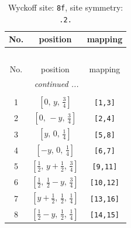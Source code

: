\documentclass[fleqn,8pt]{jsarticle}
\begin{document}
\begin{longtable}{ccc}
\caption{Wyckoff site: {\tt 8f}, site symmetry: {\tt .2.}}
 \\
 \hline \hline
No. & position & mapping \\ \hline \endfirsthead

\multicolumn{2}{l}{\tablename\ \thetable{}} \\
 \hline \hline
No. & position & mapping \\ \hline \endhead

 \hline \hline
\multicolumn{2}{r}{\footnotesize\it continued ...} \\ \endfoot

 \hline \hline
\multicolumn{2}{r}{} \\ \endlastfoot

1 & $\left[ 0,\, y,\, \frac{3}{4} \right]$ & {\tt [1,3]} \\ \hline
2 & $\left[ 0,\, - y,\, \frac{3}{4} \right]$ & {\tt [2,4]} \\ \hline
3 & $\left[ y,\, 0,\, \frac{1}{4} \right]$ & {\tt [5,8]} \\ \hline
4 & $\left[ - y,\, 0,\, \frac{1}{4} \right]$ & {\tt [6,7]} \\ \hline
5 & $\left[ \frac{1}{2},\, y + \frac{1}{2},\, \frac{3}{4} \right]$ & {\tt [9,11]} \\ \hline
6 & $\left[ \frac{1}{2},\, \frac{1}{2} - y,\, \frac{3}{4} \right]$ & {\tt [10,12]} \\ \hline
7 & $\left[ y + \frac{1}{2},\, \frac{1}{2},\, \frac{1}{4} \right]$ & {\tt [13,16]} \\ \hline
8 & $\left[ \frac{1}{2} - y,\, \frac{1}{2},\, \frac{1}{4} \right]$ & {\tt [14,15]} \\
\end{longtable}
\renewcommand{\arraystretch}{1.2}
\end{document}
